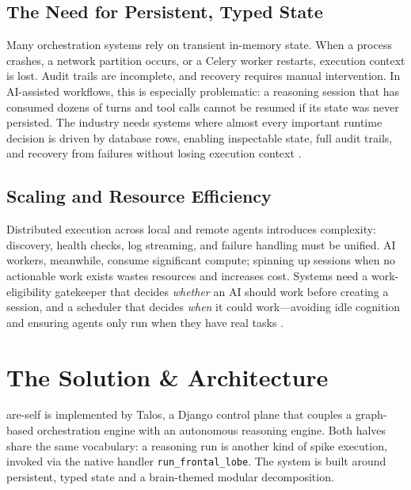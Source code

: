 \documentclass[11pt]{article}
\begin{document}
	\subsection{The Need for Persistent, Typed State}
	Many orchestration systems rely on transient in-memory state. When a process crashes, a network partition occurs, or a Celery worker restarts, execution context is lost. Audit trails are incomplete, and recovery requires manual intervention. In AI-assisted workflows, this is especially problematic: a reasoning session that has consumed dozens of turns and tool calls cannot be resumed if its state was never persisted. The industry needs systems where almost every important runtime decision is driven by database rows, enabling inspectable state, full audit trails, and recovery from failures without losing execution context \cite{talosLiveCodebase}.

	\subsection{Scaling and Resource Efficiency}
	Distributed execution across local and remote agents introduces complexity: discovery, health checks, log streaming, and failure handling must be unified. AI workers, meanwhile, consume significant compute; spinning up sessions when no actionable work exists wastes resources and increases cost. Systems need a work-eligibility gatekeeper that decides \emph{whether} an AI should work before creating a session, and a scheduler that decides \emph{when} it could work---avoiding idle cognition and ensuring agents only run when they have real tasks \cite{talosTemporal,talosPFC}.

	\section{The Solution \& Architecture}
	\label{sec:solution}

	are-self is implemented by Talos, a Django control plane that couples a graph-based orchestration engine with an autonomous reasoning engine. Both halves share the same vocabulary: a reasoning run is another kind of spike execution, invoked via the native handler \texttt{run\_frontal\_lobe}. The system is built around persistent, typed state and a brain-themed modular decomposition.
\end{document}
